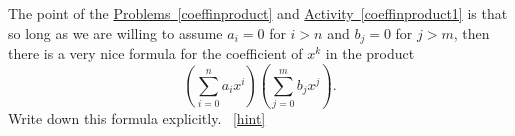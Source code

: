 \documentclass{book}
\begin{document}
\setcounter{project}{247}
\addtocounter{project}{-1}
\begin{activity}[]\label{coeffinproduct2}
\hypertarget{p-1331}{}%
The point of the \hyperref[coeffinproduct]{Problems~\ref{coeffinproduct}} and \hyperref[coeffinproduct1]{Activity~\ref{coeffinproduct1}} is that so long as we are willing to assume \(a_i=0\) for \(i>n\) and \(b_j =0\) for \(j>m\), then there is a very nice formula for the coefficient of \(x^k\) in the product%
\begin{equation*}
\left(\sum_{i=0}^n a_ix^i\right)\left(\sum_{j=0}^m b_jx^j\right).
\end{equation*}
Write down this formula explicitly.%
~\hfill{\tiny\hyperlink{a-247}{[hint]}\hypertarget{q-247}{}}\end{activity}
\end{document}
